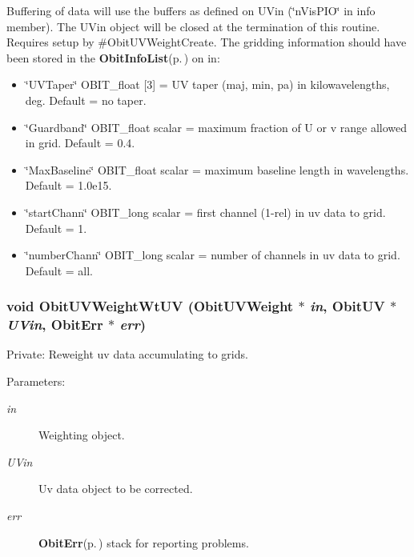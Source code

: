 Buffering of data will use the buffers as defined on UVin (\char`\"{}n\-Vis\-PIO\char`\"{} in info member). The UVin object will be closed at the termination of this routine. Requires setup by \#Obit\-UVWeight\-Create. The gridding information should have been stored in the {\bf Obit\-Info\-List}{\rm (p.\,\pageref{structObitInfoList})} on in: \begin{itemize}
\item \char`\"{}UVTaper\char`\"{} OBIT\_\-float [3] = UV taper (maj, min, pa) in kilowavelengths, deg. Default = no taper. \item \char`\"{}Guardband\char`\"{} OBIT\_\-float scalar = maximum fraction of U or v range allowed in grid. Default = 0.4. \item \char`\"{}Max\-Baseline\char`\"{} OBIT\_\-float scalar = maximum baseline length in wavelengths. Default = 1.0e15. \item \char`\"{}start\-Chann\char`\"{} OBIT\_\-long scalar = first channel (1-rel) in uv data to grid. Default = 1. \item \char`\"{}number\-Chann\char`\"{} OBIT\_\-long scalar = number of channels in uv data to grid. Default = all. 
\end{itemize}
\subsubsection{\setlength{\rightskip}{0pt plus 5cm}void Obit\-UVWeight\-Wt\-UV ({\bf Obit\-UVWeight} $\ast$ {\em in}, {\bf Obit\-UV} $\ast$ {\em UVin}, {\bf Obit\-Err} $\ast$ {\em err})}\label{ObitUVWeight_8c_a12}


Private: Reweight uv data accumulating to grids. 

\begin{Desc}
\item[Parameters:]
\begin{description}
\item[{\em in}]Weighting object. \item[{\em UVin}]Uv data object to be corrected. \item[{\em err}]{\bf Obit\-Err}{\rm (p.\,\pageref{structObitErr})} stack for reporting problems. \end{description}
\end{Desc}

